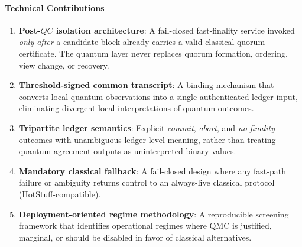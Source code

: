 \documentclass{ieeeaccess}
\begin{document}
\paragraph{Technical Contributions}
\begin{enumerate}
    \item \textbf{Post-$QC$ isolation architecture}: A fail-closed fast-finality service invoked \textit{only after} a candidate block already carries a valid classical quorum certificate. The quantum layer never replaces quorum formation, ordering, view change, or recovery.
    \item \textbf{Threshold-signed common transcript}: A binding mechanism that converts local quantum observations into a single authenticated ledger input, eliminating divergent local interpretations of quantum outcomes.
    \item \textbf{Tripartite ledger semantics}: Explicit \textit{commit}, \textit{abort}, and \textit{no-finality} outcomes with unambiguous ledger-level meaning, rather than treating quantum agreement outputs as uninterpreted binary values.
    \item \textbf{Mandatory classical fallback}: A fail-closed design where any fast-path failure or ambiguity returns control to an always-live classical protocol (HotStuff-compatible).
    \item \textbf{Deployment-oriented regime methodology}: A reproducible screening framework that identifies operational regimes where QMC is justified, marginal, or should be disabled in favor of classical alternatives.
\end{enumerate}
\end{document}
